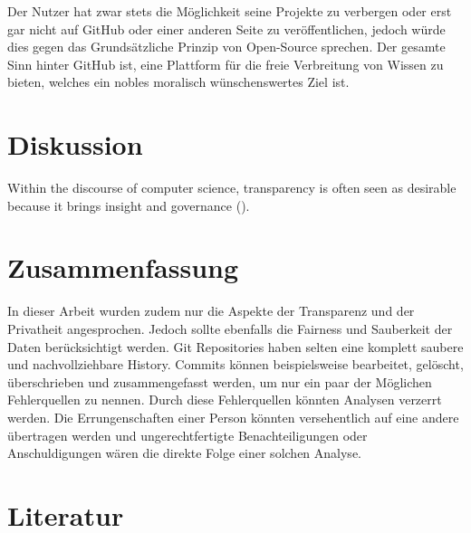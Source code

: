 \documentclass[12pt,a4paper]{article}
\begin{document}
Der Nutzer hat zwar stets die Möglichkeit seine Projekte zu verbergen oder erst gar nicht auf GitHub oder einer anderen Seite zu veröffentlichen, jedoch würde dies gegen das Grundsätzliche Prinzip von Open-Source sprechen.
Der gesamte Sinn hinter GitHub ist, eine Plattform für die freie Verbreitung von Wissen zu bieten, welches ein nobles moralisch wünschenswertes Ziel ist.

\section{Diskussion}

Within the discourse of computer science, transparency is often seen as desirable because it brings insight and governance (\cite[p.~6]{article:seeing-knowing}).

\section{Zusammenfassung}


In dieser Arbeit wurden zudem nur die Aspekte der Transparenz und der Privatheit angesprochen.
Jedoch sollte ebenfalls die Fairness und Sauberkeit der Daten berücksichtigt werden.
Git Repositories haben selten eine komplett saubere und nachvollziehbare History.
Commits können beispielsweise bearbeitet, gelöscht, überschrieben und zusammengefasst werden, um nur ein paar der Möglichen Fehlerquellen zu nennen.
Durch diese Fehlerquellen könnten Analysen verzerrt werden.
Die Errungenschaften einer Person könnten versehentlich auf eine andere übertragen werden und ungerechtfertigte Benachteiligungen oder Anschuldigungen wären die direkte Folge einer solchen Analyse.

\section{Literatur}

\printbibliography
\end{document}
